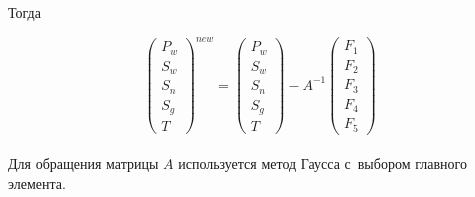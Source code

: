 Тогда

\begin{equation}
\begin{pmatrix}
P_w\\
S_w\\
S_n\\
S_g\\
T
\end{pmatrix}^{new}
=
\begin{pmatrix}
P_w\\
S_w\\
S_n\\
S_g\\
T
\end{pmatrix}
-A^{-1}
\begin{pmatrix}
F_1\\
F_2\\
F_3\\
F_4\\
F_5
\end{pmatrix}
\end{equation}\\

Для обращения матрицы $A$ используется метод Гаусса с~выбором
главного элемента\cite{Kalitkin}.
